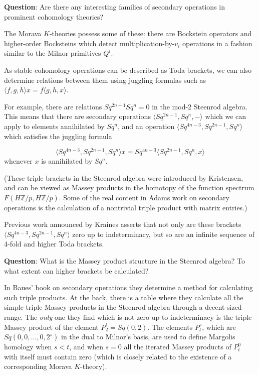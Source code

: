 \documentclass[12pt,titlepage]{article}
\newcommand{\lt}{<}
\theoremstyle{plain}
\theoremstyle{definition}
\theoremstyle{remark}
\begin{document}
\textbf{Question}: Are there any interesting families of secondary operations in prominent cohomology theories?

The Morava $K$-theories possess some of these: there are Bockstein operators and higher-order Bocksteins which detect multiplication-by-$v_i$ operations in a fashion similar to the Milnor primitives $Q^i$.

As stable cohomology operations can be described as Toda brackets, we can also determine relations between them using juggling formulas such as $\langle f,g,h\rangle x = f\langle g,h,x\rangle$.

For example, there are relations $Sq^{2n-1} Sq^n = 0$ in the mod-$2$ Steenrod algebra. This means that there are secondary operations $\langle Sq^{2n-1}, Sq^n, -\rangle$ which we can apply to elements annihilated by $Sq^n$, and an operation $\langle Sq^{4n-3}, Sq^{2n-1},
Sq^n\rangle$ which satisfies the juggling formula

\begin{displaymath}
\langle Sq^{4n-3}, Sq^{2n-1}, Sq^n\rangle x = Sq^{4n-3}\langle Sq^{2n-1},
Sq^n,x\rangle
\end{displaymath}
whenever $x$ is annihilated by $Sq^n$.

(These triple brackets in the Steenrod algebra were introduced by Kristensen, and can be viewed as Massey products in the homotopy of the function spectrum $F(H\mathbb{Z}/p,H\mathbb{Z}/p)$. Some of the real content in Adams work on secondary operations is the calculation of a nontrivial triple product with matrix entries.)

Previous work announced by Kraines asserts that not only are these brackets $\langle Sq^{4n-3}, Sq^{2n-1}, Sq^n\rangle$ zero up to indeterminacy, but so are an infinite sequence of 4-fold and higher Toda brackets.

\textbf{Question}: What is the Massey product structure in the Steenrod algebra? To what extent can higher brackets be calculated?

In Baues'{} book on secondary operations they determine a method for calculating such triple products. At the back, there is a table where they calculate all the simple triple Massey products in the Steenrod algebra through a decent-sized range. The \emph{only} one they find which is not zero up to indeterminacy is the triple Massey product of the element $P_2^1 = Sq(0,2)$. The elements $P_t^s$, which are $Sq(0,0,\ldots,0,2^s)$ in the dual to Milnor'{}s basis, are used to define Margolis homology when $s \lt t$, and when $s=0$ all the iterated Massey products of $P_t^0$ with itself must contain zero (which is closely related to the existence of a corresponding Morava $K$-theory).
\end{document}
